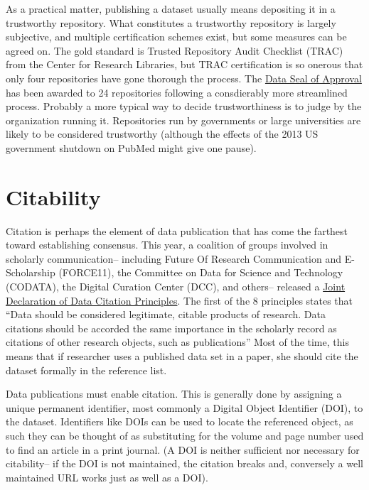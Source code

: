\documentclass[10pt,a4paper,twocolumn]{article}
\begin{document}
As a practical matter, publishing a dataset usually means depositing it in a trustworthy repository. 
What constitutes a trustworthy repository is largely subjective, and multiple certification schemes exist, but some measures can be agreed on. 
The gold standard is Trusted Repository Audit Checklist (TRAC)\cite{dale_trustworthy_2007} from the Center for Research Libraries, but TRAC certification is so onerous that only four repositories have gone thorough the process. 
The \href{http://datasealofapproval.org/}{Data Seal of Approval} has been awarded to 24 repositories following a consdierably more streamlined process.
Probably a more typical way to decide trustworthiness is to judge by the organization running it. 
Repositories run by governments or large universities are likely to be considered trustworthy (although the effects of the 2013 US government shutdown on PubMed might give one pause).


\section*{Citability}\label{citability}

Citation is perhaps the element of data publication that has come the farthest toward establishing consensus.  
This year, a coalition of groups involved in scholarly communication– including Future Of Research Communication and E-Scholarship (FORCE11)\cite{bourne_improving_2012}, the Committee on Data for Science and Technology (CODATA)\cite{socha_out_2013}, the Digital Curation Center (DCC), and others– released a \href{http://www.force11.org/datacitation}{Joint Declaration of Data Citation Principles}.
The first of the 8 principles states that 
``Data should be considered legitimate, citable products of research. Data citations should be accorded the same importance in the scholarly record as citations of other research objects, such as publications''
Most of the time, this means that if researcher uses a published data set in a paper, she should cite the dataset formally in the reference list. 
	
Data publications must enable citation. 
This is generally done by assigning a unique permanent identifier, most commonly a Digital Object Identifier (DOI), to the dataset. 
Identifiers like DOIs can be used to locate the referenced object, as such they can be thought of as substituting for the volume and page number used to find an article in a print journal.
(A DOI is neither sufficient nor necessary for citability-- if the DOI is not maintained, the citation breaks and, conversely a well maintained URL works just as well as a DOI). 
\end{document}
